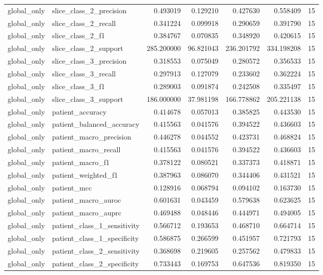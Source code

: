 \begin{tabular}{llrrrrr}
global_only & slice_class_2_precision & 0.493019 & 0.129210 & 0.427630 & 0.558409 & 15 \\
global_only & slice_class_2_recall & 0.341224 & 0.099918 & 0.290659 & 0.391790 & 15 \\
global_only & slice_class_2_f1 & 0.384767 & 0.070835 & 0.348920 & 0.420615 & 15 \\
global_only & slice_class_2_support & 285.200000 & 96.821043 & 236.201792 & 334.198208 & 15 \\
global_only & slice_class_3_precision & 0.318553 & 0.075049 & 0.280572 & 0.356533 & 15 \\
global_only & slice_class_3_recall & 0.297913 & 0.127079 & 0.233602 & 0.362224 & 15 \\
global_only & slice_class_3_f1 & 0.289003 & 0.091874 & 0.242508 & 0.335497 & 15 \\
global_only & slice_class_3_support & 186.000000 & 37.981198 & 166.778862 & 205.221138 & 15 \\
global_only & patient_accuracy & 0.414678 & 0.057013 & 0.385825 & 0.443530 & 15 \\
global_only & patient_balanced_accuracy & 0.415563 & 0.041576 & 0.394522 & 0.436603 & 15 \\
global_only & patient_macro_precision & 0.446278 & 0.044552 & 0.423731 & 0.468824 & 15 \\
global_only & patient_macro_recall & 0.415563 & 0.041576 & 0.394522 & 0.436603 & 15 \\
global_only & patient_macro_f1 & 0.378122 & 0.080521 & 0.337373 & 0.418871 & 15 \\
global_only & patient_weighted_f1 & 0.387963 & 0.086070 & 0.344406 & 0.431521 & 15 \\
global_only & patient_mcc & 0.128916 & 0.068794 & 0.094102 & 0.163730 & 15 \\
global_only & patient_macro_auroc & 0.601631 & 0.043459 & 0.579638 & 0.623625 & 15 \\
global_only & patient_macro_auprc & 0.469488 & 0.048446 & 0.444971 & 0.494005 & 15 \\
global_only & patient_class_1_sensitivity & 0.566712 & 0.193653 & 0.468710 & 0.664714 & 15 \\
global_only & patient_class_1_specificity & 0.586875 & 0.266599 & 0.451957 & 0.721793 & 15 \\
global_only & patient_class_2_sensitivity & 0.368698 & 0.219605 & 0.257562 & 0.479833 & 15 \\
global_only & patient_class_2_specificity & 0.733443 & 0.169753 & 0.647536 & 0.819350 & 15 \\

\end{tabular}
